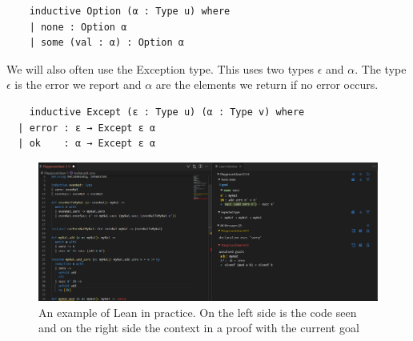 \begin{lstlisting}
    inductive Option (α : Type u) where
    | none : Option α
    | some (val : α) : Option α
\end{lstlisting}

We will also often use the Exception type. This uses two types $\epsilon$ and $\alpha$. The type $\epsilon$ is the error we report and $\alpha$ are the elements we return if no error occurs.


\begin{lstlisting}
    inductive Except (ε : Type u) (α : Type v) where
  | error : ε → Except ε α
  | ok    : α → Except ε α
\end{lstlisting}

\begin{figure}
    \centering
    \includegraphics[scale=0.25]{Lean_example.png}
    \caption{An example of Lean in practice. On the left side is the code seen and on the right side the context in a proof with the current goal}
\end{figure}
